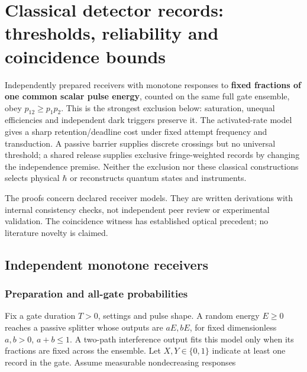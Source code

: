 \documentclass[11pt,a4paper]{article}
\begin{document}
\hypertarget{classical-detector-records-thresholds-reliability-and-coincidence-bounds}{%
\section{Classical detector records: thresholds, reliability and
coincidence
bounds}\label{classical-detector-records-thresholds-reliability-and-coincidence-bounds}}

Independently prepared receivers with monotone responses to
\textbf{fixed fractions of one common scalar pulse energy}, counted on
the same full gate ensemble, obey \(p_{12}\ge p_1p_2\). This is the
strongest exclusion below: saturation, unequal efficiencies and
independent dark triggers preserve it. The activated-rate model gives a
sharp retention/deadline cost under fixed attempt frequency and
transduction. A passive barrier supplies discrete crossings but no
universal threshold; a shared release supplies exclusive fringe-weighted
records by changing the independence premise. Neither the exclusion nor
these classical constructions selects physical \(\hbar\) or reconstructs
quantum states and instruments.

The proofs concern declared receiver models. They are written
derivations with internal consistency checks, not independent peer
review or experimental validation. The coincidence witness has
established optical precedent; no literature novelty is claimed.

\hypertarget{independent-monotone-receivers}{%
\subsection{Independent monotone
receivers}\label{independent-monotone-receivers}}

\hypertarget{preparation-and-all-gate-probabilities}{%
\subsubsection{Preparation and all-gate
probabilities}\label{preparation-and-all-gate-probabilities}}

Fix a gate duration \(T>0\), settings and pulse shape. A random energy
\(E\ge0\) reaches a passive splitter whose outputs are \(aE,bE\), for
fixed dimensionless \(a,b>0\), \(a+b\le1\). A two-path interference
output fits this model only when its fractions are fixed across the
ensemble. Let \(X,Y\in\{0,1\}\) indicate at least one record in the
gate. Assume measurable nondecreasing responses
\end{document}

